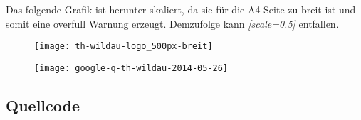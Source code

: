 Das folgende Grafik ist herunter skaliert, da sie für die A4 Seite zu breit ist und somit eine overfull Warnung erzeugt. Demzufolge kann \textit{[scale=0.5]} entfallen.\par

\begin{figure}[ht]
	\centering
	\texttt{[image: th-wildau-logo\_500px-breit]}
	\label{fig:thWildau050}
\end{figure}

\begin{figure}[ht]
	\centering
	\texttt{[image: google-q-th-wildau-2014-05-26]}
	\label{fig:googleThWildau}
\end{figure}

\subsection{Quellcode}\label{quellcode}

